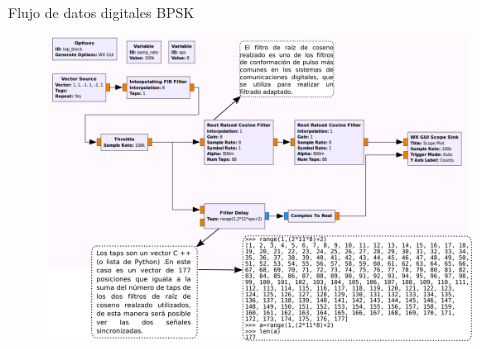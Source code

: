 \begin{frame}{Flujo de datos digitales BPSK}
\begin{figure}
\includegraphics[width=.9\textwidth]{parte1/lab5/pdf/lab5_3.pdf}
\end{figure}
\end{frame}


